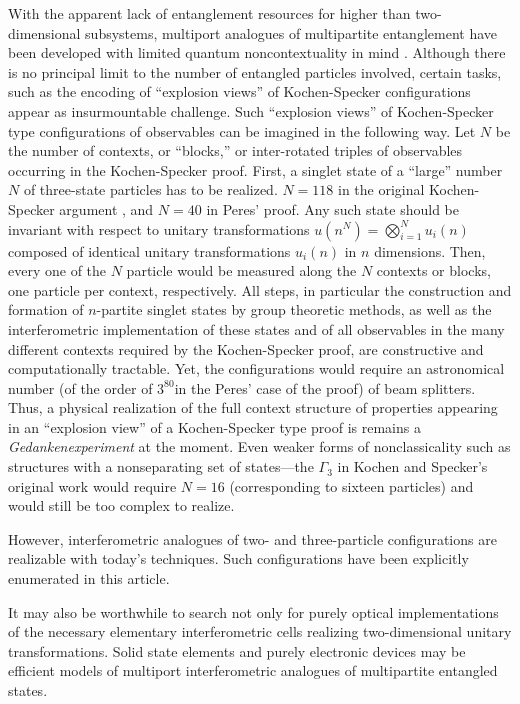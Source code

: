 \documentclass[pra,showpacs,showkeys,amsfonts]{revtex4}
\begin{document}
With the apparent lack of entanglement resources for higher than two-dimensional subsystems,
multiport analogues of multipartite entanglement have been developed with limited
quantum noncontextuality in mind \cite{svozil-2004-qnc}.
Although
there is no principal limit to the number of entangled particles involved,
certain tasks, such as the encoding  of
``explosion views'' of  Kochen-Specker configurations appear as
insurmountable challenge.
Such
``explosion views'' of  Kochen-Specker
type configurations of observables can be imagined in the following way.
Let $N$ be the number of contexts, or ``blocks,'' or inter-rotated triples of observables
occurring in the Kochen-Specker proof.
First, a singlet state of a ``large'' number $N$
of three-state particles has to be realized.
$N=118$ in the original
Kochen-Specker argument \cite{kochen1},
and $N=40$ in Peres'  \cite{peres,svozil-tkadlec} proof.
Any such state should be invariant with respect to unitary transformations
$u(n^N)=\bigotimes_{i=1}^N u_i(n)$ composed of identical unitary
transformations $u_i(n)$ in $n$ dimensions.
Then, every one of the $N$ particle would be measured along
the $N$ contexts or blocks,  one particle per context, respectively.
All steps, in particular the construction and formation of $n$-partite singlet states
by group theoretic methods,
as well as the interferometric implementation of these states
and of all observables in the many different contexts required by the
Kochen-Specker proof, are constructive and computationally tractable.
Yet,  the  configurations
would require an astronomical number (of the order of $3^{80}$in the Peres' case of the proof)
of beam splitters.
Thus, a physical realization of the full context structure of properties
appearing in an ``explosion view'' of a Kochen-Specker type proof is
remains a {\it Gedankenexperiment} at the moment.
Even weaker forms of nonclassicality such as structures with
a nonseparating set of states---the $\Gamma_3$ in Kochen and Specker's original work
\cite{kochen1} would require $N=16$ (corresponding to sixteen particles)
and would still be too complex to realize.



However, interferometric analogues of two- and three-particle
configurations are realizable with today's techniques.
Such configurations have been explicitly enumerated in this article.

It may also be worthwhile to search not only for  purely  optical implementations
of the necessary elementary
interferometric cells realizing two-dimensional unitary transformations.
Solid state elements and purely electronic devices
may be efficient models of multiport interferometric analogues of multipartite
entangled states.
\end{document}
